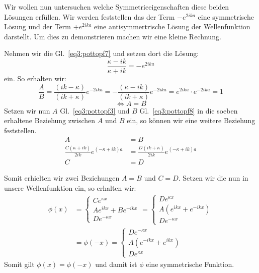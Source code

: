 Wir wollen nun untersuchen welche Symmetrieeigenschaften diese beiden Lösungen
erfüllen. Wir werden feststellen das der Term $-e^{2ika}$ eine symmetrische Lösung
und der Term $+e^{2ika}$ eine antisymmertrische Lösung der Wellenfunktion
darstellt. 
Um dies zu demonstrieren machen wir eine kleine Rechnung.

Nehmen wir die Gl.~\eqref{eq3:pottopf7} und setzen dort die Lösung:
\[ \frac{\kappa-ik}{\kappa+ik}=- e^{2ika} \]
ein. So erhalten wir:
\begin{equation*}
  \frac A B =\frac{(ik-\kappa)}{(ik+\kappa)}e^{-2ika}
      =-\frac{(\kappa-ik)}{(ik+\kappa)}e^{-2ika}
      = e^{2ika}\cdot e^{-2ika}
      =1
\end{equation*}
\[ \Leftrightarrow A = B \] Setzen wir nun $A$ Gl.~\eqref{eq3:pottopf3} und $B$
Gl.~\eqref{eq3:pottopf8} in die soeben erhaltene Beziehung zwischen $A$ und $B$
ein, so können wir eine weitere Beziehung feststellen.
\begin{align*}
  A &= B \\
  \frac{C(\kappa+ik)}{2ik}e^{(-\kappa +ik)a} 
  &=\frac{D(ik+\kappa)}{2ik}e^{(-\kappa+ik)a}\\
  C &= D
\end{align*}

Somit erhielten wir zwei Beziehungen $A=B$ und $C=D$. Setzen wir die nun in
unsere Wellenfunktion ein, so erhalten wir:
\begin{align*}
  \phi(x) &= \begin{cases}
  Ce^{\kappa x}\\
  Ae^{ikx}+Be^{-ikx}\\
  De^{-\kappa x}
\end{cases}
= \begin{cases}
  De^{\kappa x}\\
  A\left(e^{ikx}+e^{-ikx}\right)\\
  De^{-\kappa x}
\end{cases}\\  
&=\phi(-x) = \begin{cases} 
 De^{-\kappa x}\\
  A\left(e^{-ikx}+e^{ikx}\right)\\
  De^{\kappa x} 
\end{cases}
\end{align*}
Somit gilt $\phi(x)=\phi(-x)$ und damit ist $\phi$ eine symmetrische Funktion.

